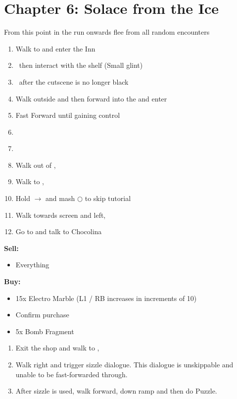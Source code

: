 \chapter{Chapter 6: Solace from the Ice}
From this point in the run onwards flee from all random encounters
\begin{enumerate}
	\item Walk to and enter the Inn
	\item \cs\ then interact with the shelf (Small glint)
	\item \cs\ after the cutscene is no longer black
	\item Walk outside and then forward into the  and enter 
	\item Fast Forward until gaining control
	\item {}
	\item \cs\
	\item Walk out of , \cs\
	\item Walk to , \cs\
	\item Hold $\rightarrow$ and mash $\bigcirc$ to skip tutorial
	\item Walk towards screen and left, 
	\item Go to \location{North Promenade} and talk to Chocolina
\end{enumerate}
\begin{shop}
\textbf{Sell:}
	\begin{itemize}
		\item Everything
	\end{itemize}
\textbf{Buy:}
	\begin{itemize}
		\item 15x Electro Marble (L1 / RB increases in increments of 10)
		\item Confirm purchase
		\item 5x Bomb Fragment
	\end{itemize}
\end{shop}
\begin{enumerate}[resume]
	\item Exit the shop and walk to , 
	\item Walk right and trigger sizzle dialogue. This dialogue is unskippable and unable to be fast-forwarded through.
	\item After sizzle is used, walk forward, down ramp and then do Puzzle.
\end{enumerate}
